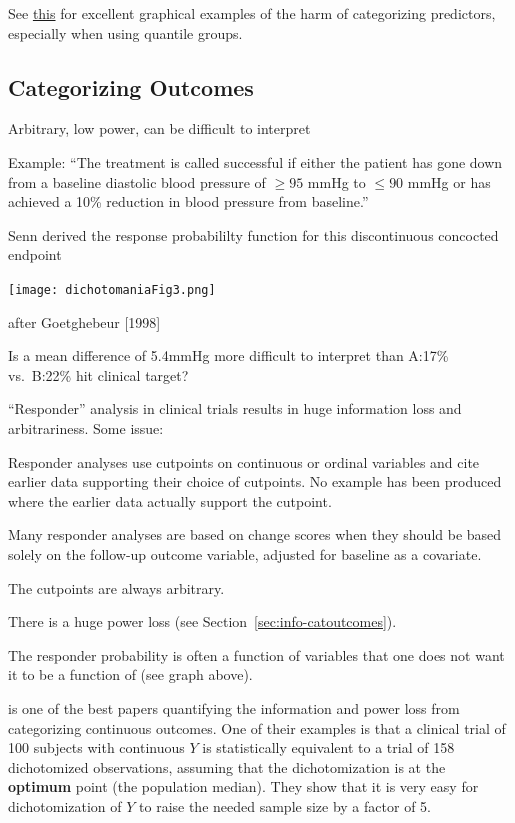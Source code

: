 See
\href{https://bmcmedresmethodol.biomedcentral.com/articles/10.1186/1471-2288-12-21}{this} 
for excellent graphical examples of the harm of categorizing
predictors, especially when using quantile groups.

\subsection{Categorizing Outcomes}
\bi
\item Arbitrary, low power, can be difficult to interpret
\item Example: ``The treatment is called successful if either the
  patient has gone down from a baseline diastolic blood pressure of
  $\geq 95$ mmHg to $\leq 90$ mmHg or has achieved a 10\% reduction in
  blood pressure from baseline.''
\item Senn derived the response probabililty function for this
  discontinuous concocted endpoint
\ei

\centerline{\texttt{[image: dichotomaniaFig3.png]}}
\citet{sen05dic} after Goetghebeur [1998]

Is a mean difference of 5.4mmHg more difficult to interpret than
A:17\% vs.\ B:22\% hit clinical target?

``Responder'' analysis in clinical trials results in huge information loss and arbitrariness.  Some issue:
\bi
\item Responder analyses use cutpoints on continuous or ordinal variables and cite earlier data supporting their choice of cutpoints.  No example has been produced where the earlier data actually support the cutpoint.
\item Many responder analyses are based on change scores when they should be based solely on the follow-up outcome variable, adjusted for baseline as a covariate.
\item The cutpoints are always arbitrary.
\item There is a huge power loss (see Section~\ref{sec:info-catoutcomes}).
\item The responder probability is often a function of variables that one does not want it to be a function of (see graph above).
\ei


\citet{fed09con} is one of the best papers quantifying the information
and power loss from categorizing continuous outcomes.  One of their
examples is that a clinical trial of 100 subjects with continuous $Y$
is statistically equivalent to a trial of 158 dichotomized
observations, assuming that the dichotomization is at the
\textbf{optimum} point (the population median).  They show that it is
very easy for dichotomization of $Y$ to raise the needed sample size
by a factor of 5.

